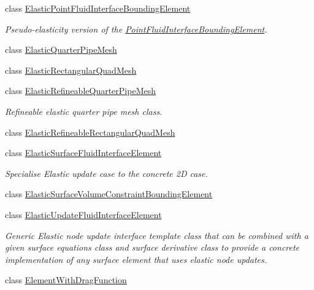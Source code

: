 \begin{DoxyCompactItemize}
\item 
class \hyperlink{classoomph_1_1ElasticPointFluidInterfaceBoundingElement}{Elastic\+Point\+Fluid\+Interface\+Bounding\+Element}
\begin{DoxyCompactList}\small\item\em Pseudo-\/elasticity version of the \hyperlink{classoomph_1_1PointFluidInterfaceBoundingElement}{Point\+Fluid\+Interface\+Bounding\+Element}. \end{DoxyCompactList}\item 
class \hyperlink{classoomph_1_1ElasticQuarterPipeMesh}{Elastic\+Quarter\+Pipe\+Mesh}
\item 
class \hyperlink{classoomph_1_1ElasticRectangularQuadMesh}{Elastic\+Rectangular\+Quad\+Mesh}
\item 
class \hyperlink{classoomph_1_1ElasticRefineableQuarterPipeMesh}{Elastic\+Refineable\+Quarter\+Pipe\+Mesh}
\begin{DoxyCompactList}\small\item\em Refineable elastic quarter pipe mesh class. \end{DoxyCompactList}\item 
class \hyperlink{classoomph_1_1ElasticRefineableRectangularQuadMesh}{Elastic\+Refineable\+Rectangular\+Quad\+Mesh}
\item 
class \hyperlink{classoomph_1_1ElasticSurfaceFluidInterfaceElement}{Elastic\+Surface\+Fluid\+Interface\+Element}
\begin{DoxyCompactList}\small\item\em Specialise Elastic update case to the concrete 2D case. \end{DoxyCompactList}\item 
class \hyperlink{classoomph_1_1ElasticSurfaceVolumeConstraintBoundingElement}{Elastic\+Surface\+Volume\+Constraint\+Bounding\+Element}
\item 
class \hyperlink{classoomph_1_1ElasticUpdateFluidInterfaceElement}{Elastic\+Update\+Fluid\+Interface\+Element}
\begin{DoxyCompactList}\small\item\em Generic Elastic node update interface template class that can be combined with a given surface equations class and surface derivative class to provide a concrete implementation of any surface element that uses elastic node updates. \end{DoxyCompactList}\item 
class \hyperlink{classoomph_1_1ElementWithDragFunction}{Element\+With\+Drag\+Function}
\item 

\end{DoxyCompactItemize}
